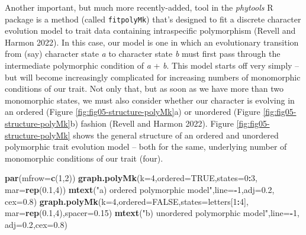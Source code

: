\documentclass[fleqn,10pt,lineno]{wlpeerj} %
\newenvironment{Shaded}{\begin{snugshade}}{\end{snugshade}}
\newcommand{\AttributeTok}[1]{\textcolor[rgb]{0.13,0.29,0.53}{#1}}
\newcommand{\ConstantTok}[1]{\textcolor[rgb]{0.56,0.35,0.01}{#1}}
\newcommand{\DecValTok}[1]{\textcolor[rgb]{0.00,0.00,0.81}{#1}}
\newcommand{\FloatTok}[1]{\textcolor[rgb]{0.00,0.00,0.81}{#1}}
\newcommand{\FunctionTok}[1]{\textcolor[rgb]{0.13,0.29,0.53}{\textbf{#1}}}
\newcommand{\NormalTok}[1]{#1}
\newcommand{\SpecialCharTok}[1]{\textcolor[rgb]{0.81,0.36,0.00}{\textbf{#1}}}
\newcommand{\StringTok}[1]{\textcolor[rgb]{0.31,0.60,0.02}{#1}}
\begin{document}
Another important, but much more recently-added, tool in the \emph{phytools} R package is a method (called \texttt{fitpolyMk}) that's designed to fit a discrete character evolution model to trait data containing intraspecific polymorphism (Revell and Harmon 2022). In this case, our model is one in which an evolutionary transition from (say) character state \emph{a} to character state \emph{b} must first pass through the intermediate polymorphic condition of \emph{a} + \emph{b}. This model starts off very simply -- but will become increasingly complicated for increasing numbers of monomorphic conditions of our trait. Not only that, but as soon as we have more than two monomorphic states, we must also consider whether our character is evolving in an ordered (Figure \ref{fig:fig05-structure-polyMk}a) or unordered (Figure \ref{fig:fig05-structure-polyMk}b) fashion (Revell and Harmon 2022). Figure \ref{fig:fig05-structure-polyMk} shows the general structure of an ordered and unordered polymorphic trait evolution model -- both for the same, underlying number of monomorphic conditions of our trait (four).

\begin{Shaded}
\begin{Highlighting}[]
\FunctionTok{par}\NormalTok{(}\AttributeTok{mfrow=}\FunctionTok{c}\NormalTok{(}\DecValTok{1}\NormalTok{,}\DecValTok{2}\NormalTok{))}
\FunctionTok{graph.polyMk}\NormalTok{(}\AttributeTok{k=}\DecValTok{4}\NormalTok{,}\AttributeTok{ordered=}\ConstantTok{TRUE}\NormalTok{,}\AttributeTok{states=}\DecValTok{0}\SpecialCharTok{:}\DecValTok{3}\NormalTok{,}
  \AttributeTok{mar=}\FunctionTok{rep}\NormalTok{(}\FloatTok{0.1}\NormalTok{,}\DecValTok{4}\NormalTok{))}
\FunctionTok{mtext}\NormalTok{(}\StringTok{"a) ordered polymorphic model"}\NormalTok{,}\AttributeTok{line=}\SpecialCharTok{{-}}\DecValTok{1}\NormalTok{,}\AttributeTok{adj=}\FloatTok{0.2}\NormalTok{,}
  \AttributeTok{cex=}\FloatTok{0.8}\NormalTok{)}
\FunctionTok{graph.polyMk}\NormalTok{(}\AttributeTok{k=}\DecValTok{4}\NormalTok{,}\AttributeTok{ordered=}\ConstantTok{FALSE}\NormalTok{,}\AttributeTok{states=}\NormalTok{letters[}\DecValTok{1}\SpecialCharTok{:}\DecValTok{4}\NormalTok{],}
  \AttributeTok{mar=}\FunctionTok{rep}\NormalTok{(}\FloatTok{0.1}\NormalTok{,}\DecValTok{4}\NormalTok{),}\AttributeTok{spacer=}\FloatTok{0.15}\NormalTok{)}
\FunctionTok{mtext}\NormalTok{(}\StringTok{"b) unordered polymorphic model"}\NormalTok{,}\AttributeTok{line=}\SpecialCharTok{{-}}\DecValTok{1}\NormalTok{,}
  \AttributeTok{adj=}\FloatTok{0.2}\NormalTok{,}\AttributeTok{cex=}\FloatTok{0.8}\NormalTok{)}
\end{Highlighting}
\end{Shaded}
\end{document}
